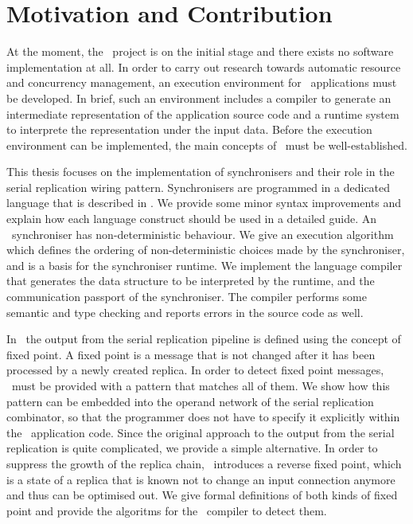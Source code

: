     \section{Motivation and Contribution}
At the moment, the \ak\ project is on the initial stage and there exists no software implementation at all. In order to carry out research towards automatic resource and concurrency management, an execution environment for \ak\ applications must be developed. In brief, such an environment includes a compiler to generate an intermediate representation of the application source code and a runtime system to interprete the representation under the input data. Before the execution environment can be implemented, the main concepts of \ak\ must be well-established.

This thesis focuses on the implementation of synchronisers and their role in the serial replication wiring pattern. Synchronisers are programmed in a dedicated language that is described in \cite{astrakahn}. We provide some minor syntax improvements and explain how each language construct should be used in a detailed guide. An \ak\ synchroniser has non-deterministic behaviour. We give an execution algorithm which defines the ordering of non-deterministic choices made by the synchroniser, and is a basis for the synchroniser runtime. We implement the language compiler that generates the data structure to be interpreted by the runtime, and the communication passport of the synchroniser. The compiler performs some semantic and type checking and reports errors in the source code as well.

In \ak\ the output from the serial replication pipeline is defined using the concept of fixed point. A fixed point is a message that is not changed after it has been processed by a newly created replica. In order to detect fixed point messages, \ak\ must be provided with a pattern that matches all of them. We show how this pattern can be embedded into the operand network of the serial replication combinator, so that the programmer does not have to specify it explicitly within the \ak\ application code. Since the original approach to the output from the serial replication is quite complicated, we provide a simple alternative. In order to suppress the growth of the replica chain, \ak\ introduces a reverse fixed point, which is a state of a replica that is known not to change an input connection anymore and thus can be optimised out. We give formal definitions of both kinds of fixed point and provide the algoritms for the \ak\ compiler to detect them.



